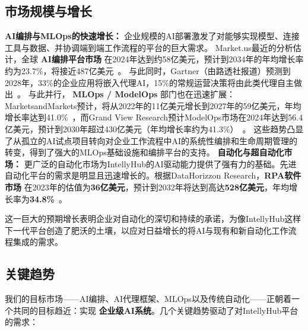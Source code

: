 \documentclass[11pt, a4paper, oneside]{article}
\begin{document}
\subsection{市场规模与增长}
\textbf{AI编排与MLOps的快速增长：} 企业规模的AI部署激发了对能够实现模型、连接工具与数据、并协调端到端工作流程的平台的巨大需求。  
Market.us最近的分析估计，全球 \textbf{AI编排平台市场} 在2024年达到约58亿美元，预计到2034年的年均增长率约为23.7\%，将接近487亿美元~\cite{AIOrch}。  
与此同时，Gartner（由路透社报道）预测到2028年，33\%的企业应用将嵌入代理AI，15\%的常规运营决策将由此类代理自主做出~\cite{GartnerAgentic}。  
与此并行， \textbf{MLOps / ModelOps} 部门也在迅速扩展：MarketsandMarkets预计，将从2022年的11亿美元增长到2027年的59亿美元，年均增长率达到41.0\%~\cite{MLOpsMM}，而Grand View Research预计ModelOps市场在2024年达到56.4亿美元，预计到2030年超过430亿美元（年均增长率约为41.3\%）~\cite{ModelOpsGV}。  
这些趋势凸显了从孤立的AI试点项目转向对企业工作流程中AI的系统性编排和生命周期管理的转变，得到了强大的MLOps基础设施和编排平台的支持。\newline\newline
\textbf{自动化与超自动化市场：} 更广泛的自动化市场为IntellyHub的AI驱动能力提供了强有力的基础。先进自动化平台的需求是明显且迅速增长的。根据DataHorizzon Research，\textbf{RPA软件市场} 在2023年的估值为\textbf{36亿美元}，预计到2032年将达到高达\textbf{528亿美元}，年均增长率为\textbf{34.8\%}~\cite{datahorizzonRPA}。

这一巨大的预期增长表明企业对自动化的深切和持续的承诺，为像IntellyHub这样下一代平台创造了肥沃的土壤，以应对日益增长的将AI与现有和新自动化工作流程集成的需求。

\subsection{关键趋势}
我们的目标市场——AI编排、AI代理框架、MLOps以及传统自动化——正朝着一个共同的目标趋近：实现 \textbf{企业级AI系统}。几个关键趋势驱动了对IntellyHub平台的需求：
\end{document}
